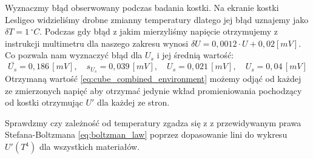 \documentclass[12pt]{article}
\begin{document}
Wyznaczmy błąd obserwowany podczas badania kostki. Na ekranie kostki Lesligeo widzieliśmy drobne zmianny temperatury dlatego jej błąd uznajemy jako $\delta T = 1 \, ^{\circ}C$.
Podczas gdy błąd z jakim mierzyliśmy napięcie otrzymujemy z instrukcji multimetru \cite{radiation_multimeter} dla naszego zakresu wynosi $\delta U = 0{,}0012 \cdot U + 0{,}02 [mV]$.
Co pozwala nam wyznaczyć błąd dla $U_s$ i jej średnią wartość:
\begin{equation}
    \bar{U_s} = 0{,}186 \, [mV], \quad s_{U_s} = 0{,}039 \, [mV], \quad U_s = 0{,}021 \, [mV], \quad U_s = 0{,}04 \, [mV]
    \label{eq:cube_combined_environment}
\end{equation}
Otrzymaną wartość \eqref{eq:cube_combined_environment} możemy odjąć od każdej ze zmierzonych napięć aby otrzymać jedynie wkład promieniowania pochodzący od kostki otrzymując $U'$ dla każdej ze stron.

Sprawdzmy czy zależność od temperatury zgadza się z z przewidywanym prawa Stefana-Boltzmana \eqref{eq:boltzman_law} poprzez dopasowanie lini do wykresu $U'(T^4)$ dla wszystkich materiałów.
\end{document}
